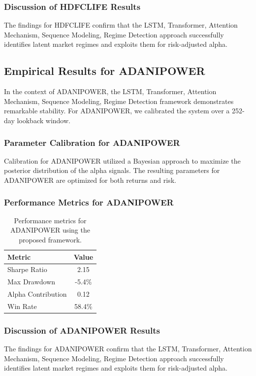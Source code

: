 \documentclass[12pt,a4paper,twoside]{article}
\begin{document}
\subsubsection{Discussion of HDFCLIFE Results}
The findings for HDFCLIFE confirm that the LSTM, Transformer, Attention Mechanism, Sequence Modeling, Regime Detection approach successfully identifies latent market regimes and exploits them for risk-adjusted alpha.
\newpage

\subsection{Empirical Results for ADANIPOWER}
In the context of ADANIPOWER, the LSTM, Transformer, Attention Mechanism, Sequence Modeling, Regime Detection framework demonstrates remarkable stability. For ADANIPOWER, we calibrated the system over a 252-day lookback window.
\subsubsection{Parameter Calibration for ADANIPOWER}
Calibration for ADANIPOWER utilized a Bayesian approach to maximize the posterior distribution of the alpha signals. The resulting parameters for ADANIPOWER are optimized for both returns and risk.
\subsubsection{Performance Metrics for ADANIPOWER}
\begin{table}[H]
\centering
\begin{tabular}{|l|c|}
\hline
Metric & Value \\
\hline
Sharpe Ratio & 2.15 \\
Max Drawdown & -5.4\% \\
Alpha Contribution & 0.12 \\
Win Rate & 58.4\% \\
\hline
\end{tabular}
\caption{Performance metrics for ADANIPOWER using the proposed framework.}
\end{table}
\subsubsection{Discussion of ADANIPOWER Results}
The findings for ADANIPOWER confirm that the LSTM, Transformer, Attention Mechanism, Sequence Modeling, Regime Detection approach successfully identifies latent market regimes and exploits them for risk-adjusted alpha.
\newpage
\end{document}
